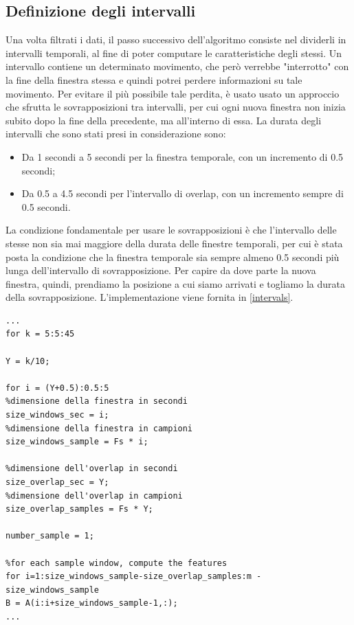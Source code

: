 \subsection{Definizione degli intervalli}
Una volta filtrati i dati, il passo successivo dell'algoritmo consiste nel dividerli in intervalli temporali, al fine di poter computare le caratteristiche degli stessi. Un intervallo contiene un determinato movimento, che però verrebbe "interrotto" con la fine della finestra stessa e quindi potrei perdere informazioni su tale movimento. Per evitare il più possibile tale perdita, è usato usato un approccio che sfrutta le sovrapposizioni tra intervalli, per cui ogni nuova finestra non inizia subito dopo la fine della precedente, ma all'interno di essa. La durata degli intervalli che sono stati presi in considerazione sono:
\begin{itemize}
	\item  Da 1 secondi a 5 secondi per la finestra temporale, con un incremento di 0.5 secondi;
	\item Da 0.5 a 4.5 secondi per l'intervallo di overlap, con un incremento sempre di 0.5 secondi.
\end{itemize}
La condizione fondamentale per usare le sovrapposizioni è che l'intervallo delle stesse non sia mai maggiore della durata delle finestre temporali, per cui è stata posta la condizione che la finestra temporale sia sempre almeno 0.5 secondi più lunga dell'intervallo di sovrapposizione. Per capire da dove parte la nuova finestra, quindi, prendiamo la posizione a cui siamo arrivati e togliamo la durata della sovrapposizione. L'implementazione viene fornita in \ref{intervals}.
\begin{lstlisting}[style=Matlab-editor,frame=single, caption=Definizione degli intervalli, label=intervals]  % Start your code-block
...
for k = 5:5:45

Y = k/10;

for i = (Y+0.5):0.5:5
%dimensione della finestra in secondi
size_windows_sec = i;
%dimensione della finestra in campioni
size_windows_sample = Fs * i;

%dimensione dell'overlap in secondi
size_overlap_sec = Y;
%dimensione dell'overlap in campioni
size_overlap_samples = Fs * Y;

number_sample = 1;

%for each sample window, compute the features
for i=1:size_windows_sample-size_overlap_samples:m - size_windows_sample
B = A(i:i+size_windows_sample-1,:);
...
\end{lstlisting}
